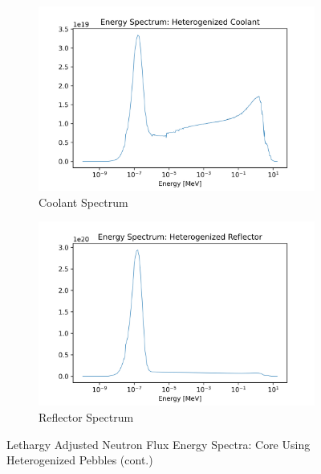 \begin{figure}[H]\ContinuedFloat
\centering

\begin{subfigure}{0.95\textwidth}
  \includegraphics[width=0.95\linewidth]{figures/cool_spec_het}
  \caption{Coolant Spectrum}
  \label{fig:het-cool}
\end{subfigure}%


\begin{subfigure}{0.95\textwidth}
  \includegraphics[width=0.95\linewidth]{figures/reflect_spec_het}
  \caption{Reflector Spectrum}
  \label{fig:het-reflec}
\end{subfigure}%


\caption{Lethargy Adjusted Neutron Flux Energy Spectra: Core Using Heterogenized Pebbles (cont.)}
\label{fig:hom-spec}
\end{figure}
